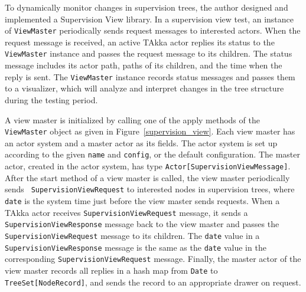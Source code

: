 To dynamically monitor changes in supervision trees, the author designed and 
implemented a Supervision View library. In a supervision view test, an instance 
of {\tt ViewMaster} periodically sends request messages to interested actors.  
When the request message is received, an active TAkka actor replies its 
status to the {\tt ViewMaster} instance and passes the request message to its 
children.  The status message includes its actor path, paths of its children, 
and the time when the reply is sent.  The {\tt ViewMaster} instance records 
status messages and passes them to a visualizer, which will analyze and 
interpret changes in the tree structure during the testing period.


A view master is initialized by calling one of the apply methods of the {\tt 
ViewMaster} object as given in Figure~\ref{supervision_view}.
Each view master has an actor system and a master actor as its fields.  The 
actor system is set up according to the given {\tt name} and {\tt config}, or 
the default configuration.  The master actor, created in the actor system, has 
type {\tt Actor[SupervisionViewMessage]}.  After the start method of a 
view master is called, the view master periodically sends {\tt 
SupervisionViewRequest} to interested nodes in supervision trees, where 
{\tt date} is the system time just before the view master sends requests.  
When a TAkka actor receives {\tt SupervisionViewRequest} message, it sends a 
{\tt SupervisionViewResponse} message back to the view master and passes the \\ 
{\tt SupervisionViewRequest} message to its children.  The {\tt date} value
in a \\ {\tt SupervisionViewResponse} message is the same as the {\tt date} 
value 
in the corresponding {\tt SupervisionViewRequest} message.  Finally, the master 
actor of the view master records all replies in a hash map from {\tt Date} to 
{\tt TreeSet[NodeRecord]}, and sends the record to an appropriate drawer on 
request. 



